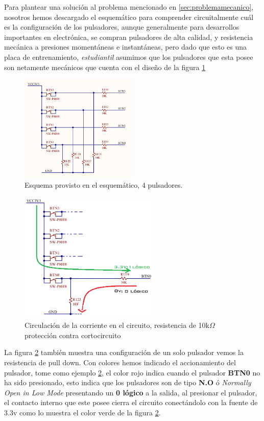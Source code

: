 \documentclass[paper=a4, fontsize=12pt]{article} 		%
\numberwithin{equation}{section}						%
\numberwithin{table}{section} 							%
\begin{document}
Para plantear una solución al problema mencionado en \ref{sec:problemamecanico}, nosotros hemos descargado el esquemático para comprender circuitalmente cuál es la configuración de los pulsadores, aunque generalmente para desarrollos importantes en electrónica, se compran  pulsadores de alta calidad, y resistencia mecánica a presiones momentáneas e instantáneas, pero dado que esto es una placa de entrenamiento, \textit{estudiantil} asumimos que los pulsadores que esta posee son netamente mecánicos que cuenta con el diseño de la figura \ref{fig:btn}
\begin{figure}[H]
  \centering
     \includegraphics[width=0.5\textwidth]{btn1.png}
  \caption{Esquema provisto en el esquemático, 4 pulsadores.}
    \label{fig:btn}
\end{figure}

\begin{figure}[H]
  \centering
     \includegraphics[width=0.6\textwidth]{btn2.png}
  \caption{Circulación de la corriente en el circuito, resistencia de 10k$\Omega$ protección contra cortocircuito}
      \label{fig:btn2}
\end{figure}
La figura \ref{fig:btn2} también muestra una configuración de un solo pulsador vemos la resistencia de pull down. Con colores hemos indicado el accionamiento del pulsador, tome como ejemplo \ref{fig:btn2}, el color rojo indica cuando el pulsador \textbf{BTN0} no ha sido presionado, esto indica que los pulsadores son de tipo \textbf{N.O} ó \textit{Normally Open in Low Mode} presentando un \textbf{0 lógico} a la salida, al presionar el pulsador, el contacto interno que este posee cierra el circuito conectándolo con la fuente de 3.3v como lo muestra el color verde de la figura \ref{fig:btn2}.
\end{document}
